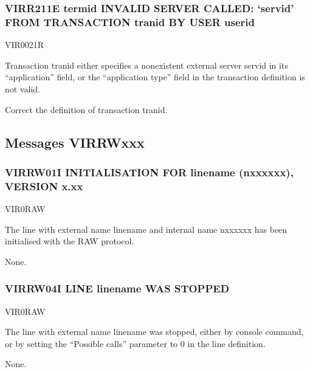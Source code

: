 \documentclass[letterpaper,10pt,english]{sphinxmanual}
\begin{document}
\subsubsection{VIRR211E termid INVALID SERVER CALLED: ‘servid’ FROM TRANSACTION tranid BY USER userid}
\label{\detokenize{messages:virr211e-termid-invalid-server-called-servid-from-transaction-tranid-by-user-userid}}\begin{description}
\sphinxAtStartPar
VIR0021R

\sphinxAtStartPar
Transaction tranid either specifies a non\sphinxhyphen{}existent external server servid in its “application” field, or the “application type” field in the transaction definition is not valid.

\sphinxAtStartPar
Correct the definition of transaction tranid.

\end{description}


\subsection{Messages VIRRWxxx}
\label{\detokenize{messages:messages-virrwxxx}}

\subsubsection{VIRRW01I INITIALISATION FOR linename (n\sphinxhyphen{}xxxxxx), VERSION x.xx}
\label{\detokenize{messages:virrw01i-initialisation-for-linename-n-xxxxxx-version-x-xx}}\begin{description}
\sphinxAtStartPar
VIR0RAW

\sphinxAtStartPar
The line with external name linename and internal name n\sphinxhyphen{}xxxxxx has been initialised with the RAW protocol.

\sphinxAtStartPar
None.

\end{description}


\subsubsection{VIRRW04I LINE linename WAS STOPPED}
\label{\detokenize{messages:virrw04i-line-linename-was-stopped}}\begin{description}
\sphinxAtStartPar
VIR0RAW

\sphinxAtStartPar
The line with external name linename was stopped, either by console command, or by setting the “Possible calls” parameter to 0 in the line definition.

\sphinxAtStartPar
None.

\end{description}
\end{document}
